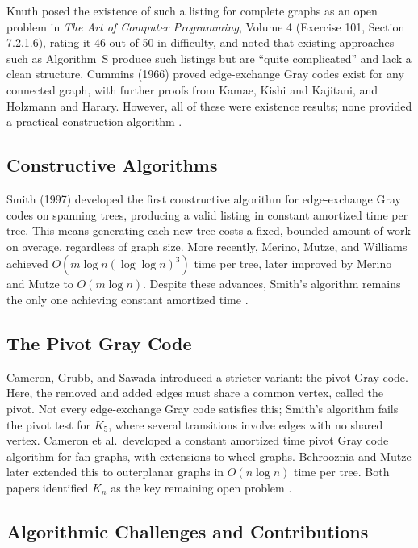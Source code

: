 \documentclass{article}
\begin{document}
Knuth posed the existence of such a listing for complete graphs as an open problem in
\textit{The Art of Computer Programming}, Volume 4 (Exercise 101, Section 7.2.1.6),
rating it 46 out of 50 in difficulty, and noted that existing approaches such as
Algorithm~S produce such listings but are ``quite complicated'' and lack a clean
structure. Cummins (1966) proved edge-exchange Gray codes exist for any connected
graph, with further proofs from Kamae, Kishi and Kajitani, and Holzmann and Harary.
However, all of these were existence results; none provided a practical construction
algorithm \cite{liu2026}.

\subsection{Constructive Algorithms}

Smith (1997) developed the first constructive algorithm for edge-exchange Gray codes
on spanning trees, producing a valid listing in constant amortized time per tree. This
means generating each new tree costs a fixed, bounded amount of work on average,
regardless of graph size. More recently, Merino, Mutze, and Williams achieved
$O(m \log n (\log \log n)^3)$ time per tree, later improved by Merino and Mutze to
$O(m \log n)$. Despite these advances, Smith's algorithm remains the only one achieving
constant amortized time \cite{liu2026}.

\subsection{The Pivot Gray Code}

Cameron, Grubb, and Sawada introduced a stricter variant: the pivot Gray code. Here,
the removed and added edges must share a common vertex, called the pivot. Not every
edge-exchange Gray code satisfies this; Smith's algorithm fails the pivot test for
$K_5$, where several transitions involve edges with no shared vertex. Cameron et al.\
developed a constant amortized time pivot Gray code algorithm for fan graphs, with
extensions to wheel graphs. Behrooznia and Mutze later extended this to outerplanar
graphs in $O(n \log n)$ time per tree. Both papers identified $K_n$ as the key
remaining open problem \cite{liu2026}.

\subsection{Algorithmic Challenges and Contributions}
\end{document}
